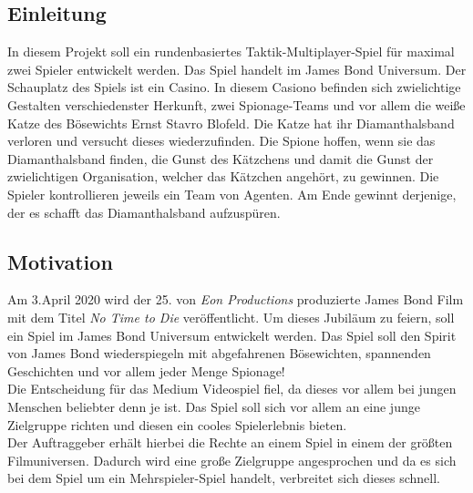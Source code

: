 \subsection{Einleitung}
In diesem Projekt soll ein rundenbasiertes Taktik-Multiplayer-Spiel für maximal zwei Spieler entwickelt werden. Das Spiel handelt im James Bond Universum. 
Der Schauplatz des Spiels ist ein Casino. In diesem Casiono befinden sich zwielichtige Gestalten verschiedenster Herkunft, zwei Spionage-Teams und vor allem die weiße Katze des Bösewichts Ernst Stavro Blofeld. Die Katze hat ihr Diamanthalsband verloren und versucht dieses wiederzufinden.
Die Spione hoffen, wenn sie das Diamanthalsband finden, die Gunst des Kätzchens und damit die Gunst der zwielichtigen Organisation, welcher das Kätzchen angehört, zu gewinnen.
Die Spieler kontrollieren jeweils ein Team von Agenten. Am Ende gewinnt derjenige, der es schafft das Diamanthalsband aufzuspüren.


\subsection{Motivation}
Am 3.April 2020 wird der 25. von \textit{Eon Productions} produzierte James Bond Film mit dem Titel \textit{No Time to Die} veröffentlicht. Um dieses Jubiläum zu feiern, soll ein Spiel im James Bond Universum entwickelt werden.
Das Spiel soll den Spirit von James Bond wiederspiegeln mit abgefahrenen Bösewichten, spannenden Geschichten und vor allem jeder Menge Spionage!\\
Die Entscheidung für das Medium Videospiel fiel, da dieses vor allem bei jungen Menschen beliebter denn je ist. Das Spiel soll sich vor allem an eine junge Zielgruppe richten und diesen ein cooles Spielerlebnis bieten.\\

Der Auftraggeber erhält hierbei die Rechte an einem Spiel in einem der größten Filmuniversen. Dadurch wird eine große Zielgruppe angesprochen und da es sich bei dem Spiel um ein Mehrspieler-Spiel handelt, verbreitet sich dieses schnell.


